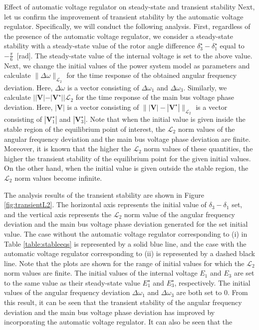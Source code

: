 \documentclass[graybox, envcountchap]{svmult}
\begin{document}
\begin{example}{Effect of automatic voltage regulator on steady-state and
transient stability}
Next, let us confirm the improvement of transient stability by the automatic
voltage regulator. Specifically, we will conduct the following analysis. First,
regardless of the presence of the automatic voltage regulator, we consider a
steady-state stability with a steady-state value of the rotor angle difference
$\delta_3^{\star}-\delta_1^{\star}$ equal to $-\tfrac{\pi}{6}$~[rad]. The
steady-state value of the internal voltage is set to the above value. Next, we
change the initial values of the power system model as parameters and calculate
$\|\Delta\omega\|_{\mathcal{L}_2}$ for the time response of the obtained angular
frequency deviation. Here, $\Delta \omega$ is a vector consisting of $\Delta
\omega_1$ and $\Delta \omega_3$. Similarly, we calculate
$||\bm{V}|-|\bm{V}^{\star}||{\mathcal{L}_2}$ for the time response of the main
bus voltage phase deviation. Here, $|\bm{V}|$ is a vector consisting of
$\||\bm{V}|-|\bm{V}^{\star}| \|_{\mathcal{L}_2}$ is a vector consisting of
$|\bm{V}_1^{\star}|$ and $|\bm{V}_3^{\star}|$. Note that when the initial value
is given inside the stable region of the equilibrium point of interest, the
$\mathcal{L}_2$ norm values of the angular frequency deviation and the main bus
voltage phase deviation are finite. Moreover, it is known that the higher the
$\mathcal{L}_2$ norm values of these quantities, the higher the transient
stability of the equilibrium point for the given initial values. On the other
hand, when the initial value is given outside the stable region, the
$\mathcal{L}_2$ norm values become infinite.

The analysis results of the transient stability are shown in
Figure \ref{fig:transientL2}. The horizontal axis represents the initial value of
$\delta_3-\delta_1$ set, and the vertical axis represents the $\mathcal{L}_2$
norm value of the angular frequency deviation and the main bus voltage phase
deviation generated for the set initial value. The case without the automatic
voltage regulator corresponding to (i) in Table \ref{table:stableeqs} is
represented by a solid blue line, and the case with the automatic voltage
regulator corresponding to (ii) is represented by a dashed black line. Note that
the plots are shown for the range of initial values for which the
$\mathcal{L}_2$ norm values are finite. The initial values of the internal
voltage $E_1$ and $E_3$ are set to the same value as their steady-state value
$E_1^{\star}$ and $E_3^{\star}$, respectively. The initial values of the angular
frequency deviation $\Delta \omega_1$ and $\Delta \omega_3$ are both set to 0.
From this result, it can be seen that the transient stability of the angular
frequency deviation and the main bus voltage phase deviation has improved by
incorporating the automatic voltage regulator. It can also be seen that the


\end{example}
\end{document}
